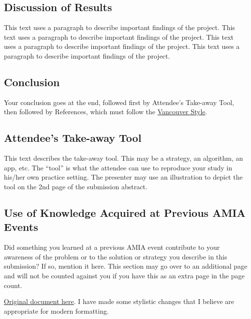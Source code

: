 \documentclass[
]{article}
\begin{document}
\hypertarget{discussion-of-results}{%
\subsection{Discussion of Results}\label{discussion-of-results}}

This text uses a paragraph to describe important findings of the project. This text uses a paragraph to describe important findings of the project. This text uses a paragraph to describe important findings of the project. This text uses a paragraph to describe important findings of the project.

\hypertarget{conclusion}{%
\subsection{Conclusion}\label{conclusion}}

Your conclusion goes at the end, followed first by Attendee's Take-away Tool, then followed by References, which must follow the \href{http://www.citethisforme.com/}{Vancouver Style}.

\hypertarget{attendees-take-away-tool}{%
\subsection{Attendee's Take-away Tool}\label{attendees-take-away-tool}}

This text describes the take-away tool. This may be a strategy, an algorithm, an app, etc. The ``tool'' is what the attendee can use to reproduce your study in his/her own practice setting. The presenter may use an illustration to depict the tool on the 2nd page of the submission abstract.

\hypertarget{use-of-knowledge-acquired-at-previous-amia-events}{%
\subsection{Use of Knowledge Acquired at Previous AMIA Events}\label{use-of-knowledge-acquired-at-previous-amia-events}}

Did something you learned at a previous AMIA event contribute to your awareness of the problem or to the solution or strategy you describe in this submission? If so, mention it here. This section may go over to an additional page and will not be counted against you if you have this as an extra page in the page count.

\href{https://www.amia.org/sites/default/files/CIC2021-Submission-Template.pdf}{Original document here}. I have made some stylistic changes that I believe are appropriate for modern formatting.
\end{document}
